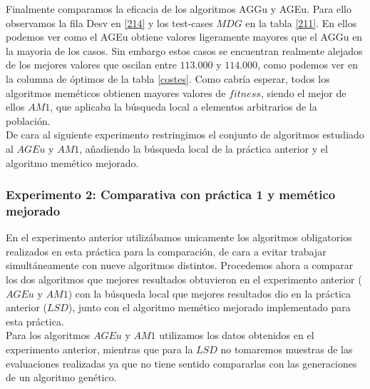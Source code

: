 \documentclass[11pt,a4paper]{article}
\begin{document}
	Finalmente comparamos la eficacia de los algoritmos AGGu y AGEu. Para ello observamos la fila Desv en \ref{214} y los test-cases $MDG$ en la tabla \ref{211}. En ellos podemos ver como el AGEu obtiene valores ligeramente mayores que el AGGu en la mayoria de los casos. Sin embargo estos casos se encuentran realmente alejados de los mejores valores que oscilan entre $113.000$ y $114.000$, como podemos ver en la columna de óptimos de la tabla \ref{costes}. Como cabría esperar, todos los algoritmos meméticos obtienen mayores valores de $fitness$, siendo el mejor de ellos $AM1$, que aplicaba la búsqueda local a elementos arbitrarios de la población. \\
	
	De cara al siguiente experimento restringimos el conjunto de algoritmos estudiado al $AGEu$ y $AM1$, añadiendo la búsqueda local de la práctica anterior y el algoritmo memético mejorado.
	
	\subsubsection{ Experimento 2: Comparativa con práctica 1 y memético mejorado}
	
	En el experimento anterior utilizábamos unicamente los algoritmos obligatorios realizados en esta práctica para la comparación, de cara a evitar trabajar simultáneamente con nueve algoritmos distintos. Procedemos ahora a comparar los dos algoritmos que mejores resultados obtuvieron en el experimento anterior ($AGEu$ y $AM1$) con la búsqueda local que mejores resultados dio en la práctica anterior ($LSD$), junto con el algoritmo memético mejorado implementado para esta práctica. \\
	
	Para los algoritmos $AGEu$ y $AM1$ utilizamos los datos obtenidos en el experimento anterior, mientras que para la $LSD$ no tomaremos muestras de las evaluaciones realizadas ya que no tiene sentido compararlas con las generaciones de un algoritmo genético. \\
	
\end{document}
